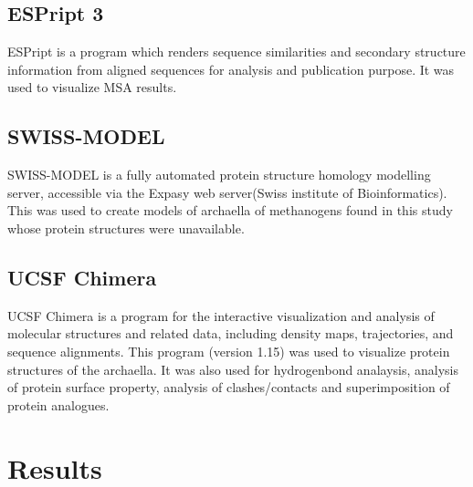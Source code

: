 \documentclass[fontsize=12pt,headsepline=true, bibliography=totocnumbered, twoside]{scrbook} %
\begin{document}
\section{ESPript 3}

ESPript is a program which renders sequence similarities and secondary structure information from aligned sequences for analysis and publication purpose. It was used to visualize \ac{MSA} results\citep{robert2014deciphering}.

\section{SWISS-MODEL}

SWISS-MODEL
is a fully automated protein structure homology modelling server, accessible via the Expasy web server(Swiss institute of Bioinformatics). This was used to create models of archaella of methanogens found in this study whose protein structures were unavailable\citep{waterhouse2018swiss}.

\section{UCSF Chimera}

UCSF Chimera is a program for the interactive visualization and analysis of molecular structures and related data, including density maps, trajectories, and sequence alignments\citep{chimera}. This program (version 1.15) was used to visualize protein structures of the archaella. It was also used for hydrogenbond analaysis, analysis of protein surface property, analysis of clashes/contacts and superimposition of protein analogues.










\chapter{Results}
\end{document}
